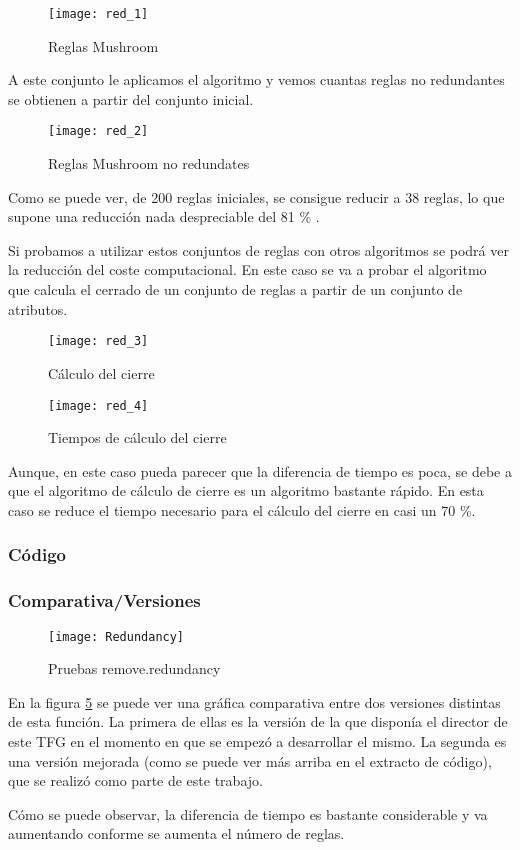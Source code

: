 \begin{figure}[H]
    \centering
    \texttt{[image: red\_1]}
    \caption{Reglas Mushroom}
    \label{fig:red_1}
\end{figure} 

A este conjunto le aplicamos el algoritmo y vemos cuantas reglas no redundantes se obtienen a partir del conjunto inicial.

\begin{figure}[H]
    \centering
    \texttt{[image: red\_2]}
    \caption{Reglas Mushroom no redundates}
    \label{fig:red_2}
\end{figure} 

Como se puede ver, de 200 reglas iniciales, se consigue reducir a 38 reglas, lo que supone una reducci\'on nada despreciable del 81 \% .

Si probamos a utilizar estos conjuntos de reglas con otros algoritmos se podr\'a ver la reducci\'on del coste computacional. En este caso se va a probar el algoritmo que calcula el cerrado de un conjunto de reglas a partir de un conjunto de atributos.

\begin{figure}[H]
    \centering
    \texttt{[image: red\_3]}
    \caption{C\'alculo del cierre}
    \label{fig:red_3}
\end{figure}

\begin{figure}[H]
    \centering
    \texttt{[image: red\_4]}
    \caption{Tiempos de c\'alculo del cierre}
    \label{fig:red_4}
\end{figure}

Aunque, en este caso pueda parecer que la diferencia de tiempo es poca, se debe a que el algoritmo de c\'alculo de cierre es un algoritmo bastante r\'apido. En esta caso se reduce el tiempo necesario para el c\'alculo del cierre en casi un 70 \%.

\newpage
\subsubsection{C\'odigo} 

\newpage
 
\subsubsection{Comparativa/Versiones} 
\begin{figure}[h]
    \centering
    \texttt{[image: Redundancy]}
    \caption{Pruebas remove.redundancy}
    \label{fig:redundancy}
\end{figure} 

En la figura \ref{fig:redundancy} se puede ver una gr\'afica comparativa entre dos versiones distintas de esta funci\'on. La primera de ellas es la versi\'on de la que dispon\'ia el director de este TFG en el momento en que se empez\'o a desarrollar el mismo. La segunda es una versi\'on mejorada (como se puede ver m\'as arriba en el extracto de c\'odigo), que se realiz\'o como parte de este trabajo.

C\'omo se puede observar, la diferencia de tiempo es bastante considerable y va aumentando conforme se aumenta el n\'umero de reglas.